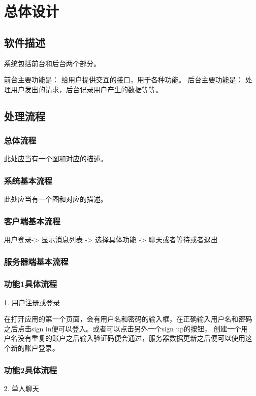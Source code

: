 \chapter{总体设计}
\section{软件描述}
系统包括前台和后台两个部分。

前台主要功能是：
给用户提供交互的接口，用于各种功能。
后台主要功能是：
处理用户发出的请求，后台记录用户产生的数据等等。

\section{处理流程}
\subsection{总体流程}
此处应当有一个图和对应的描述。

\subsection{系统基本流程}
此处应当有一个图和对应的描述。

\subsection{客户端基本流程}
用户登录-> 显示消息列表 -> 选择具体功能 -> 聊天或者等待或者退出

\subsection{服务器端基本流程}


\subsection{功能1具体流程}


1. 用户注册或登录

在打开应用的第一个页面，会有用户名和密码的输入框，在正确输入用户名和密码之后点击sign in便可以登入。或者可以点击另外一个sign up的按钮，
创建一个用户名没有重复的账户之后输入验证码便会通过，服务器数据更新之后便可以使用这个新的账户登录。


\subsection{功能2具体流程}

2. 单人聊天

